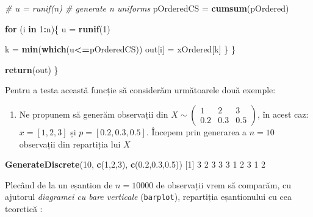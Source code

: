 \documentclass[]{article}
\newenvironment{Shaded}{\begin{snugshade}}{\end{snugshade}}
\newcommand{\KeywordTok}[1]{\textcolor[rgb]{0.13,0.29,0.53}{\textbf{#1}}}
\newcommand{\DecValTok}[1]{\textcolor[rgb]{0.00,0.00,0.81}{#1}}
\newcommand{\FloatTok}[1]{\textcolor[rgb]{0.00,0.00,0.81}{#1}}
\newcommand{\StringTok}[1]{\textcolor[rgb]{0.31,0.60,0.02}{#1}}
\newcommand{\CommentTok}[1]{\textcolor[rgb]{0.56,0.35,0.01}{\textit{#1}}}
\newcommand{\ControlFlowTok}[1]{\textcolor[rgb]{0.13,0.29,0.53}{\textbf{#1}}}
\newcommand{\OperatorTok}[1]{\textcolor[rgb]{0.81,0.36,0.00}{\textbf{#1}}}
\newcommand{\NormalTok}[1]{#1}
\providecommand{\tightlist}{%
  \setlength{\itemsep}{0pt}\setlength{\parskip}{0pt}}
\begin{document}
\begin{Shaded}
\begin{Highlighting}[]
    \CommentTok{# u = runif(n) # generate n uniforms}
\NormalTok{    pOrderedCS =}\StringTok{ }\KeywordTok{cumsum}\NormalTok{(pOrdered)}
    
    \ControlFlowTok{for}\NormalTok{ (i }\ControlFlowTok{in} \DecValTok{1}\OperatorTok{:}\NormalTok{n)\{}
\NormalTok{      u =}\StringTok{ }\KeywordTok{runif}\NormalTok{(}\DecValTok{1}\NormalTok{)}
      
\NormalTok{      k =}\StringTok{ }\KeywordTok{min}\NormalTok{(}\KeywordTok{which}\NormalTok{(u}\OperatorTok{<=}\NormalTok{pOrderedCS))}
\NormalTok{      out[i] =}\StringTok{ }\NormalTok{xOrdered[k]}
\NormalTok{    \}}
\NormalTok{  \}}
  
  \KeywordTok{return}\NormalTok{(out)}
\NormalTok{\}}
\end{Highlighting}
\end{Shaded}

Pentru a testa această funcție să considerăm următoarele două exemple:

\begin{enumerate}
\def\labelenumi{\arabic{enumi}.}
\tightlist
\item
  Ne propunem să generăm observații din
  \(X\sim\begin{pmatrix}1 & 2 & 3\\ 0.2 & 0.3 & 0.5\end{pmatrix}\), în
  acest caz: \(x=[1,2,3]\) și \(p=[0.2,0.3,0.5]\). Începem prin
  generarea a \(n = 10\) observații din repartiția lui \(X\)
\end{enumerate}

\begin{Shaded}
\begin{Highlighting}[]
\KeywordTok{GenerateDiscrete}\NormalTok{(}\DecValTok{10}\NormalTok{, }\KeywordTok{c}\NormalTok{(}\DecValTok{1}\NormalTok{,}\DecValTok{2}\NormalTok{,}\DecValTok{3}\NormalTok{), }\KeywordTok{c}\NormalTok{(}\FloatTok{0.2}\NormalTok{,}\FloatTok{0.3}\NormalTok{,}\FloatTok{0.5}\NormalTok{))}
\NormalTok{ [}\DecValTok{1}\NormalTok{] }\DecValTok{3} \DecValTok{2} \DecValTok{3} \DecValTok{3} \DecValTok{3} \DecValTok{1} \DecValTok{2} \DecValTok{3} \DecValTok{1} \DecValTok{2}
\end{Highlighting}
\end{Shaded}

Plecând de la un eșantion de \(n = 10000\) de observații vrem să
comparăm, cu ajutorul \emph{diagramei cu bare verticale}
(\texttt{barplot}), repartiția eșantionului cu cea teoretică :
\end{document}
